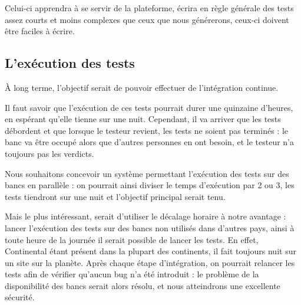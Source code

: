		Celui-ci apprendra à se servir de la plateforme, écrira en règle générale des tests assez courts et moins complexes que ceux que nous générerons, ceux-ci doivent être faciles à écrire.

	\subsection{L'exécution des tests}
	À long terme, l'objectif serait de pouvoir effectuer de l'intégration continue. 

	Il faut savoir que l'exécution de ces tests pourrait durer une quinzaine d'heures, en espérant qu'elle tienne sur une nuit. Cependant, il va arriver que les tests débordent et que lorsque le testeur revient, les tests ne soient pas terminés : le banc va être occupé alors que d'autres personnes en ont besoin, et le testeur n'a toujours pas les verdicts.

	 Nous souhaitons concevoir un système permettant l'exécution des tests sur des bancs en parallèle : on pourrait ainsi diviser le temps d'exécution par 2 ou 3, les tests tiendront sur une nuit et l'objectif principal serait tenu.

	 Mais le plus intéressant, serait d'utiliser le décalage horaire à notre avantage : lancer l'exécution des tests sur des bancs non utilisés dans d'autres pays, ainsi à toute heure de la journée il serait possible de lancer les tests. En effet, Continental étant présent dans la plupart des continents, il fait toujours nuit sur un site sur la planète. Après chaque étape d'intégration, on pourrait relancer les tests afin de vérifier qu'aucun bug n'a été introduit : le problème de la disponibilité des bancs serait alors résolu, et nous atteindrons une excellente sécurité.

